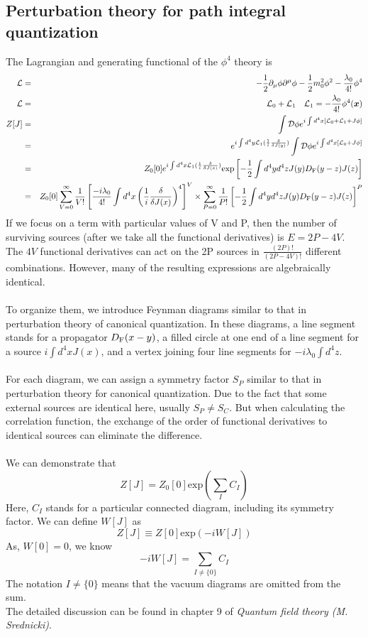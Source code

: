 \subsection{Perturbation theory for path integral quantization}
The Lagrangian and generating functional of the $\phi^4$ theory is
\begin{eqnarray}
\mathcal{L} &=& -\frac{1}{2}\partial_{\mu} \phi \partial^{\mu} \phi -\frac{1}{2}m_0^2 \phi^2 -\frac{\lambda_0}{4!}\phi^4 \nonumber \\
\mathcal{L} &=& \mathcal{L}_0 + \mathcal{L}_1 \quad \mathcal{L}_1 =- \frac{\lambda_0}{4!} \phi^4 (\bm{x}) \nonumber \\
Z[J] &=& \int \mathcal{D}\phi e^{i\int d^4x [\mathcal{L}_0 + \mathcal{L}_1 + J\phi]} \nonumber \\
&=& e^{i\int d^4y \mathcal{L}_1(\frac{1}{i} \frac{\delta}{\delta J(y)})} \int \mathcal{D}\phi e^{i\int d^4x [\mathcal{L}_0 + J\phi]} \nonumber \\
& = & Z_0[0]e^{i\int d^4x \mathcal{L}_1(\frac{1}{i} \frac{\delta}{\delta J(x)})} \mathrm{exp} \left[-\frac{1}{2} \int d^4y d^4z J(y)D_{\rm F}(y-z)J(z)\right] \nonumber \\
& =& Z_0[0]\sum_{V=0}^{\infty} \frac{1}{V!} \left[ \frac{-i\lambda_0}{4!} \int d^4x \left(\frac{1}{i} \frac{\delta}{\delta J(x)}\right)^4\right]^V \times \sum_{P=0}^{\infty} \frac{1}{P!} \left[-\frac{1}{2} \int d^4y d^4z J(y)D_{\rm F}(y-z)J(z)\right]^P \nonumber
\end{eqnarray}
If we focus on a term with particular values of V and P, then
the number of surviving sources (after we take all the functional derivatives) is $E = 2P-4V$. The $4V$ functional derivatives can act on the 2P sources in $\frac{(2P)!}{(2P-4V)!}$ different combinations. However, many of the resulting expressions are algebraically identical.\\ \\
To organize them, we introduce Feynman diagrams similar to that in perturbation theory of canonical quantization. In these diagrams, a line segment stands for a propagator $D_{\rm F}(x-y)$, a filled circle at one end of a line segment for a source $i\int d^4x J(x)$, and a vertex joining four line segments for $-i\lambda_0 \int d^4 z$.\\ \\
For each diagram, we can assign a symmetry factor $S_P$ similar to that in perturbation theory for canonical quantization. Due to the fact that some external sources are identical here, usually $S_P \neq S_C$. But when calculating the correlation function, the exchange of the order of functional derivatives to identical sources can eliminate the difference.\\ \\
We can demonstrate that
\[Z[J] = Z_0[0] \mathrm{exp}(\sum_I C_I)\]
Here, $C_I$ stands for a particular connected diagram, including its symmetry factor. We can define $W[J]$ as
\[Z[J] \equiv Z[0] \mathrm{exp}(-iW[J])\]
As, $W[0]=0$, we know
\[-iW[J] = \sum_{I \neq \{0\}} C_I\]
The notation $I\neq \{0\}$ means that the vacuum diagrams are omitted from the sum.\\
The detailed discussion can be found in chapter 9 of \emph{Quantum field theory (M. Srednicki)}.

